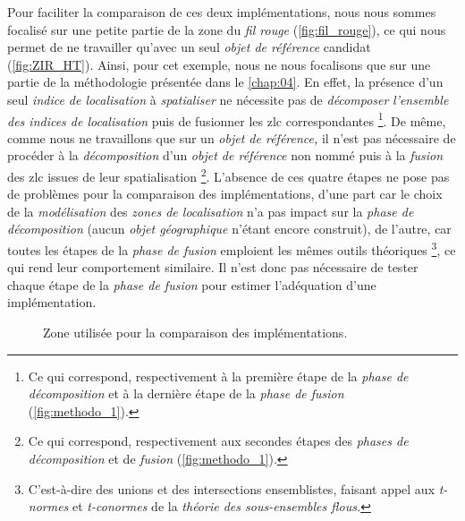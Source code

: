 Pour faciliter la comparaison de ces deux implémentations, nous nous
sommes focalisé sur une petite partie de la zone du \emph{fil rouge}
(\autoref{fig:fil_rouge}), ce qui nous permet de ne travailler qu'avec
un seul \emph{objet de référence} candidat (\autoref{fig:ZIR_HT}).
Ainsi, pour cet exemple, nous ne nous focalisons que sur une partie de
la méthodologie présentée dans le \autoref{chap:04}. En effet, la
présence d'un seul \emph{indice de localisation} à \emph{spatialiser}
ne nécessite pas de \emph{décomposer} \emph{l'ensemble des indices de
  localisation} puis de fusionner les \ac{zlc} correspondantes
\footnote{Ce qui correspond, respectivement à la première étape de la
  \emph{phase de décomposition} et à la dernière étape de la
  \emph{phase de fusion} (\autoref{fig:methodo_1}).}. De même, comme
nous ne travaillons que sur un \emph{objet de référence,} il n'est pas
nécessaire de procéder à la \emph{décomposition} d'un \emph{objet de
  référence} non nommé puis à la \emph{fusion} des \ac{zlc} issues de
leur spatialisation \footnote{Ce qui correspond, respectivement aux
  secondes étapes des \emph{phases de décomposition} et de
  \emph{fusion} (\autoref{fig:methodo_1}).}. L'absence de ces quatre
étapes ne pose pas de problèmes pour la comparaison des
implémentations, d'une part car le choix de la \emph{modélisation} des
\emph{zones de localisation} n'a pas impact sur la \emph{phase de
  décomposition} (aucun \emph{objet géographique} n'étant encore
construit), de l'autre, car toutes les étapes de la \emph{phase de
  fusion} emploient les mêmes outils théoriques \footnote{C'est-à-dire
  des unions et des intersections ensemblistes, faisant appel aux
  \emph{t-normes} et \emph{t-conormes} de la \emph{théorie des
    sous-ensembles flous.}}, ce qui rend leur comportement
similaire. Il n'est donc pas nécessaire de tester chaque étape de la
\emph{phase de fusion} pour estimer l'adéquation d'une implémentation.

\begin{figure}
  \centering 
  \caption{Zone utilisée pour la comparaison des implémentations.}
  \label{fig:ZIR_HT}
\end{figure}


